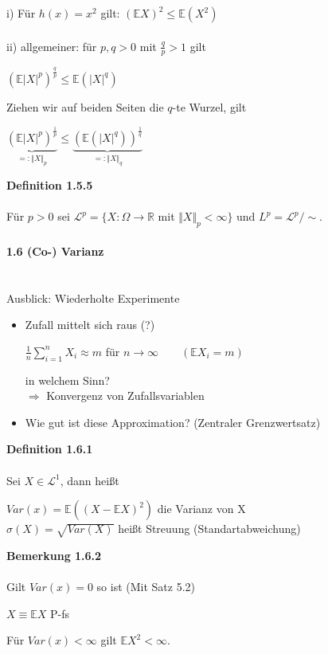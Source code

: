 \documentclass[10pt,a4paper]{report}
\numberwithin{equation}{section}
\numberwithin{figure}{section}
\theoremstyle{plain}
\theoremstyle{definition}
\theoremstyle{plain}
\theoremstyle{definition}
\theoremstyle{remark}
\theoremstyle{plain}
\theoremstyle{plain}
\theoremstyle{plain}
\newcommand{\1}{ \mathbb{1} } %
\begin{document}
i) Für $h(x)=x^2$ gilt: $(\mathbb{E}X)^2\leq \mathbb{E}(X^2)$\\\\
ii) allgemeiner: für $p,q>0$ mit $\frac{q}{p}>1$ gilt
\begin{center}
$(\mathbb{E}|X|^p)^\frac{q}{p} \leq \mathbb{E}(|X|^q)$
\end{center} 
Ziehen wir auf beiden Seiten die $q$-te Wurzel, gilt
\begin{center}
$\underbrace{(\mathbb{E}|X|^p)^\frac{1}{p}}_{=:\Vert X\Vert_p}\leq\underbrace{(\mathbb{E}(|X|^q))^\frac{1}{q}}_{=:\Vert X\Vert_q}$ 
\end{center}
\textbf{Definition 1.5.5}\\\\
Für $p>0$ sei $\mathcal{L}^p=\{X:\Omega \to \mathbb{R}$ mit $\Vert X\Vert_p<\infty\}$ und $L^p=\mathcal{L}^p/\sim$.\\\\
\Large{\textbf{1.6 (Co-) Varianz}}\normalsize\\\\\\
Ausblick: Wiederholte Experimente
\begin{itemize}
\item Zufall mittelt sich raus (?)
\begin{center}
$\frac{1}{n}\sum\limits_{i=1}^nX_i\approx m$ für $ n\to \infty \qquad (\mathbb{E}X_i=m)$  
\end{center}
in welchem Sinn?\\
$\Rightarrow$ Konvergenz von Zufallsvariablen
\item Wie gut ist diese Approximation? (Zentraler Grenzwertsatz)
\end{itemize}
\textbf{Definition 1.6.1}\\\\
Sei $X \in \mathcal{L}^1$, dann heißt 
\begin{center}
$Var(x)=\mathbb{E}((X-\mathbb{E}X)^2)$ die Varianz von X\\
$\sigma(X)=\sqrt{Var(X)}$ heißt Streuung (Standartabweichung)
\end{center} 
\textbf{Bemerkung 1.6.2}\\\\
Gilt $Var(x)=0$ so ist (Mit Satz 5.2)
\begin{center}
$X\equiv \mathbb{E}X$ P-fs
\end{center}
Für $Var(x)<\infty$ gilt $\mathbb{E}X^2< \infty$.\\\\
\end{document}
